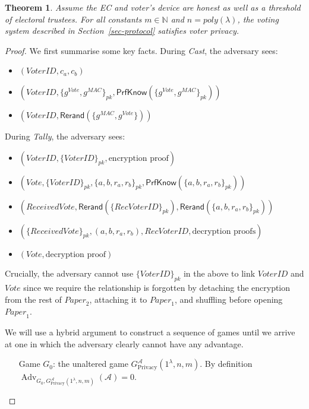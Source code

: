 \documentclass[12pt,a4paper]{article}
\DeclareMathOperator{\Adv}{\text{Adv}}
\newtheorem{theorem}{Theorem}
\theoremstyle{definition}
\newcommand{\Vote}{\mathit{Vote}}
\newcommand{\ReceivedVote}{\mathit{ReceivedVote}}
\newcommand{\VoterID}{\mathit{VoterID}}
\newcommand{\receivedvid}{\mathit{RecVoterID}}
\newcommand{\Paper}{\mathit{Paper}}
\newcommand{\Mac}{\mathit{MAC}}
\begin{document}
\begin{theorem}\label{thm-privacy}
    Assume the EC and voter's device are honest as well as a threshold of electoral trustees. For all constants $m \in \mathbb{N}$ and $n=poly(\lambda)$, the voting system described in Section~\ref{sec-protocol} satisfies voter privacy.
\end{theorem}
\begin{proof}
    We first summarise some key facts. During \textit{Cast}, the adversary sees:
    \begin{itemize}
        \item $(\VoterID, c_a, c_b)$
        \item $(\VoterID, \{g^{\Vote}, g^{\Mac}\}_{pk}, \mathsf{PrfKnow}(\{g^{\Vote}, g^{\Mac}\}_{pk}))$
        \item $(\VoterID, \mathsf{Rerand}(\{g^{\Mac}, g^{\Vote}\}))$
    \end{itemize}

    During \textit{Tally}, the adversary sees:
    \begin{itemize}
        \item $(\VoterID, \{\VoterID\}_{pk}, \text{encryption proof})$
        \item $(\Vote, \{\VoterID\}_{pk}, \{a, b, r_a, r_b\}_{pk}, \mathsf{PrfKnow}(\{a, b, r_a, r_b\}_{pk}))$
        \item $(\ReceivedVote, \mathsf{Rerand}(\{\receivedvid\}_{pk}), \mathsf{Rerand}(\{a, b, r_a, r_b\}_{pk}))$
        \item $(\{\ReceivedVote\}_{pk}, (a, b, r_a, r_b), \receivedvid, \text{decryption proofs})$
        \item $(\Vote, \text{decryption proof})$
    \end{itemize}

    Crucially, the adversary cannot use $\{\VoterID\}_{pk}$ in the above to link $\VoterID$ and $\Vote$ since we require the relationship is forgotten by detaching the encryption from the rest of $\Paper_2$, attaching it to $\Paper_1$, and shuffling before opening $\Paper_1$.

    We will use a hybrid argument to construct a sequence of games until we arrive at one in which the adversary clearly cannot have any advantage.
    \begin{itemize}[leftmargin=4em]
        \item[Game] $G_0$: the unaltered game $G^\mathcal{A}_{\text{Privacy}}(1^\lambda, n, m)$. By definition $\Adv_{G_0, G^\mathcal{A}_{\text{Privacy}}(1^\lambda, n, m)}(\mathcal{A})=0$.
        

\end{itemize}
\end{proof}
\end{document}
